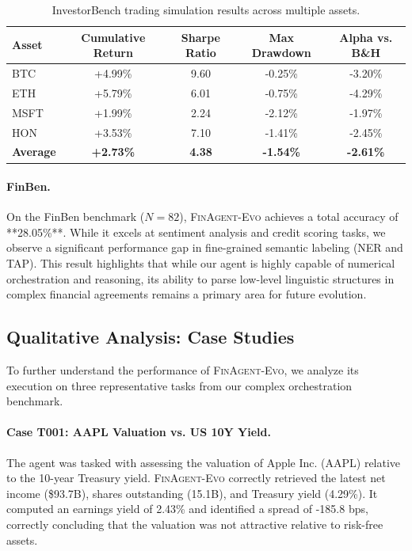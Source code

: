 \documentclass{article}
\begin{document}
\begin{table}[h]
\centering
\caption{InvestorBench trading simulation results across multiple assets.}
\label{tab:investorbench}
\begin{tabular}{lcccc}
\toprule
Asset & Cumulative Return & Sharpe Ratio & Max Drawdown & Alpha vs. B\&H \\
\midrule
BTC & +4.99\% & 9.60 & -0.25\% & -3.20\% \\
ETH & +5.79\% & 6.01 & -0.75\% & -4.29\% \\
MSFT & +1.99\% & 2.24 & -2.12\% & -1.97\% \\
HON & +3.53\% & 7.10 & -1.41\% & -2.45\% \\
\midrule
\textbf{Average} & \textbf{+2.73\%} & \textbf{4.38} & \textbf{-1.54\%} & \textbf{-2.61\%} \\
\bottomrule
\end{tabular}
\end{table}

\paragraph{FinBen.}
On the FinBen benchmark ($N=82$), \textsc{FinAgent-Evo} achieves a total accuracy of **28.05\%**. While it excels at sentiment analysis and credit scoring tasks, we observe a significant performance gap in fine-grained semantic labeling (NER and TAP). This result highlights that while our agent is highly capable of numerical orchestration and reasoning, its ability to parse low-level linguistic structures in complex financial agreements remains a primary area for future evolution.

\subsection{Qualitative Analysis: Case Studies}
To further understand the performance of \textsc{FinAgent-Evo}, we analyze its execution on three representative tasks from our complex orchestration benchmark.

\paragraph{Case T001: AAPL Valuation vs. US 10Y Yield.}
The agent was tasked with assessing the valuation of Apple Inc. (AAPL) relative to the 10-year Treasury yield. \textsc{FinAgent-Evo} correctly retrieved the latest net income (\$93.7B), shares outstanding (15.1B), and Treasury yield (4.29\%). It computed an earnings yield of 2.43\% and identified a spread of -185.8 bps, correctly concluding that the valuation was not attractive relative to risk-free assets.
\end{document}
